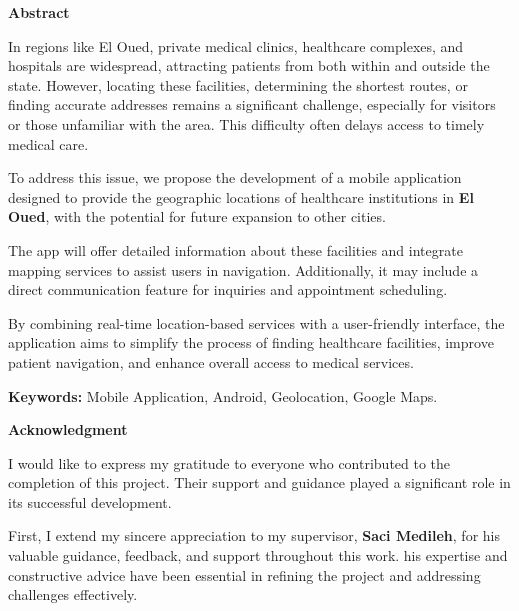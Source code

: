 \documentclass[12pt]{report}
\begin{document}
\tableofcontents
\newpage
\begin{center}
	\textbf{Abstract} \\
	\vspace*{0.3cm}
\end{center}

\noindent In regions like El Oued, private medical clinics, healthcare complexes, and hospitals are widespread, attracting patients from both within and outside the state. However, locating these facilities, determining the shortest routes, or finding accurate addresses remains a significant challenge, especially for visitors or those unfamiliar with the area. This difficulty often delays access to timely medical care. \vspace*{0.5cm}

\noindent To address this issue, we propose the development of a mobile application designed to provide the geographic locations of healthcare institutions in \textbf{El Oued}, with the potential for future expansion to other cities. \vspace*{0.5cm}

\noindent The app will offer detailed information about these facilities and integrate mapping services to assist users in navigation. Additionally, it may include a direct communication feature for inquiries and appointment scheduling. \vspace*{0.5cm}

\noindent By combining real-time location-based services with a user-friendly interface, the application aims to simplify the process of finding healthcare facilities, improve patient navigation, and enhance overall access to medical services. \vspace*{0.5cm}

\noindent \vspace*{0.5cm}\textbf{Keywords:} Mobile Application, Android, Geolocation, Google Maps.
\newpage
\begin{center}
	\textbf{Acknowledgment} \\
	\vspace*{0.3cm}
\end{center}

\noindent I would like to express my gratitude to everyone who contributed to the completion of this project. Their support and guidance played a significant role in its successful development.  \vspace*{0.5cm}

\noindent First, I extend my sincere appreciation to my supervisor, \textbf{Saci Medileh}, for his valuable guidance, feedback, and support throughout this work. his expertise and constructive advice have been essential in refining the project and addressing challenges effectively. \vspace*{0cm}
\end{document}
